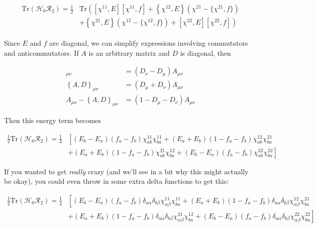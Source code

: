 \begin{align}\label{eqn:H0R2}
\begin{aligned}
\mathrm{Tr}\left(\mathcal{H}_0\mathcal{R}_2\right) = \frac{1}{2}
&\mathrm{Tr} \left([\chi^{11},E][\chi^{11},f] + \left\{\chi^{12},E\right\}(\chi^{21}-\{\chi^{21},f\})\right. \\
&\left.+ \left\{\chi^{21},E\right\}(\chi^{12}-\{\chi^{12},f\}) + [\chi^{22},E][\chi^{22},f]\right)
\end{aligned}
\end{align}

Since $E$ and $f$ are diagonal, we can simplify expressions involving commutators and anticommutators. If $A$ is an arbitrary matrix and $D$ is diagonal, then

\begin{align*}
[A,D]_{\mu\nu} &= (D_\nu-D_\mu)A_{\mu\nu} \\
\left\{A,D\right\}_{\mu\nu} &= (D_\mu+D_\nu)A_{\mu\nu} \\
A_{\mu\nu}-\left\{A,D\right\}_{\mu\nu} &= (1-D_\mu-D_\nu)A_{\mu\nu}
\end{align*}

\noindent Then this energy term becomes

\begin{align*}
\frac{1}{2}\mathrm{Tr}\left(\mathcal{H}_0\mathcal{R}_2\right) = \frac{1}{4}
& \left[(E_b-E_a)(f_a-f_b)\chi^{11}_{ab}\chi^{11}_{ba} + (E_a+E_b)(1-f_a-f_b)\chi^{12}_{ab}\chi^{21}_{ba}\right. \\
&\left.+ (E_a+E_b)(1-f_a-f_b)\chi^{21}_{ab}\chi^{12}_{ba} + (E_b-E_a)(f_a-f_b)\chi^{22}_{ab}\chi^{22}_{ba}\right]
\end{align*}

\noindent If you wanted to get \textit{really} crazy (and we'll see in a bit why this might actually be okay), you could even throw in some extra delta functions to get this:

\begin{align*}
\frac{1}{2}\mathrm{Tr}\left(\mathcal{H}_0\mathcal{R}_2\right) = \frac{1}{4}
& \left[(E_b-E_a)(f_a-f_b)\delta_{a\alpha}\delta_{b\beta}\chi^{11}_{\alpha\beta}\chi^{11}_{ba} + (E_a+E_b)(1-f_a-f_b)\delta_{a\alpha}\delta_{b\beta}\chi^{12}_{\alpha\beta}\chi^{21}_{ba}\right. \\
&\left.+ (E_a+E_b)(1-f_a-f_b)\delta_{a\alpha}\delta_{b\beta}\chi^{21}_{\alpha\beta}\chi^{12}_{ba} + (E_b-E_a)(f_a-f_b)\delta_{a\alpha}\delta_{b\beta}\chi^{22}_{\alpha\beta}\chi^{22}_{ba}\right]
\end{align*}


